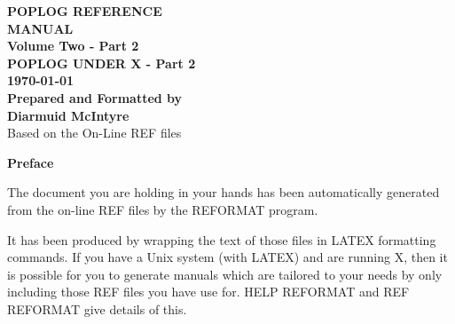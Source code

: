 


\begin{titlepage}
\begin{center}
\rule{0cm}{3cm}
{\Huge\bf POPLOG REFERENCE \\
\vspace{0.5cm}
MANUAL}\\
\vspace{3cm}
{\bf\Large
Volume Two - Part 2}\\
\vspace{1cm}
{\LARGE\bf POPLOG UNDER X - Part 2}\\
\vspace{1cm}
{\bf\Large \today }\\
\vspace{10cm}
{\LARGE\bf Prepared and Formatted by \\ Diarmuid McIntyre}\\
\vspace{1.5cm}
{\Large Based on the On-Line REF files \\}
\end{center}

\end{titlepage}


\rule{0cm}{3cm}
\begin{center}
{\Huge\bf Preface}
\end{center}
\vspace{1cm}

 The document you are holding in your hands has been automatically
generated from the on-line REF files by the REFORMAT program.

It has been produced by wrapping the text of those files in LATEX
formatting commands. If you have a Unix system (with LATEX) and are
running X, then it is possible for you to generate manuals which are
tailored to your needs by only including those REF files you have use
for. HELP REFORMAT and REF REFORMAT give details of this.


